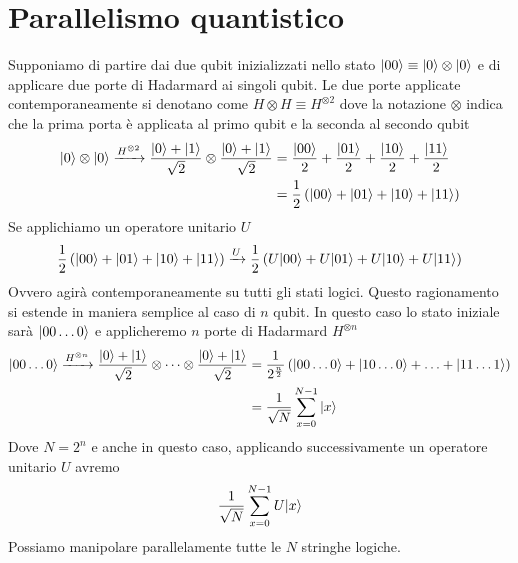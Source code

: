 \documentclass[12pt, a4paper]{report}
\begin{document}
\section{Parallelismo quantistico}
Supponiamo di partire dai due qubit inizializzati nello stato $| 00 \rangle\equiv| 0 \rangle\otimes| 0 \rangle$ e di applicare due porte di Hadarmard ai singoli qubit. Le due porte applicate contemporaneamente si denotano come $H\otimes H\equiv H^{\otimes 2}$ dove la notazione $\otimes$ indica che la prima porta è applicata al primo qubit e la seconda al secondo qubit
\begin{equation*}
    \begin{split}
        | 0 \rangle\otimes| 0 \rangle\xrightarrow{H^{\otimes 2}} \frac{| 0 \rangle+| 1 \rangle}{\sqrt{2}}\otimes\frac{| 0 \rangle+| 1 \rangle}{\sqrt{2}} &= \frac{| 00 \rangle}{2}+\frac{| 01 \rangle}{2}+\frac{| 10 \rangle}{2}+\frac{| 11 \rangle}{2} \\
        &= \frac{1}{2}\left(| 00 \rangle+| 01 \rangle+| 10 \rangle+| 11 \rangle\right)
    \end{split}
\end{equation*}
Se applichiamo un operatore unitario $U$
\begin{equation*}
    \begin{split}
        \frac{1}{2}\left(| 00 \rangle+| 01 \rangle+| 10 \rangle+| 11 \rangle\right)\xrightarrow{U}\frac{1}{2}\left(U| 00 \rangle+U| 01 \rangle+U| 10 \rangle+U| 11 \rangle\right)
    \end{split}
\end{equation*}
Ovvero agirà contemporaneamente su tutti gli stati logici. Questo ragionamento si estende in maniera semplice al caso di $n$ qubit. In questo caso lo stato iniziale sarà $| 00\ldots 0 \rangle$ e applicheremo $n$ porte di Hadarmard $H^{\otimes n}$
\begin{equation*}
    \begin{split}
        | 00\ldots 0 \rangle \xrightarrow{H^{\otimes n}} \frac{| 0 \rangle+| 1 \rangle}{\sqrt{2}}\otimes\dots\otimes\frac{| 0 \rangle+| 1 \rangle}{\sqrt{2}} &= \frac{1}{2^{\frac{n}{2}}}\left(| 00\ldots 0 \rangle+| 10\ldots 0 \rangle+\ldots+| 11\ldots 1 \rangle\right) \\
        &= \frac{1}{\sqrt{N}}\sum_{x=0}^{N-1}| x \rangle
    \end{split}
\end{equation*}
Dove $N=2^{n}$ e anche in questo caso, applicando successivamente un operatore unitario $U$ avremo
\begin{equation*}
    \frac{1}{\sqrt{N}}\sum_{x=0}^{N-1}U| x \rangle
\end{equation*}
Possiamo manipolare parallelamente tutte le $N$ stringhe logiche.
\end{document}
